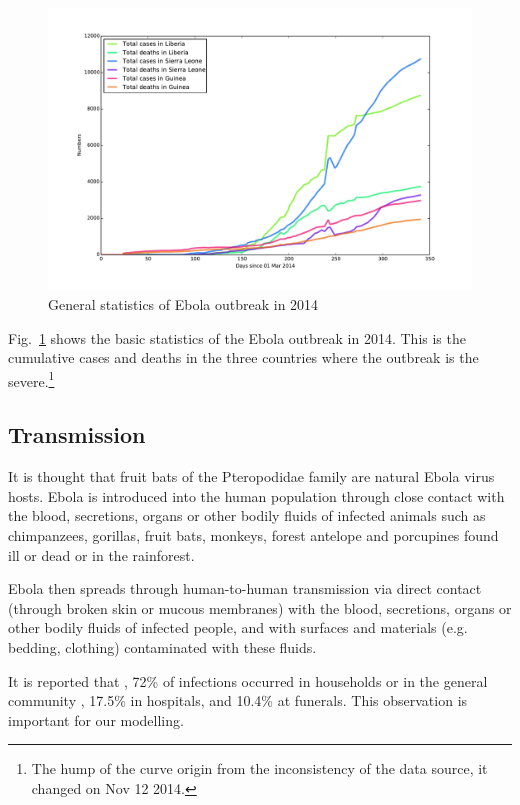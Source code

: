 \documentclass[11pt]{article}
\begin{document}
\begin{figure}[hbt]
\begin{center}
  \includegraphics[width=6in]{graph/bstats.pdf}
  \caption{General statistics of Ebola outbreak in 2014}
  \label{stats}
\end{center}  
\end{figure}

Fig.~\ref{stats} shows the basic statistics of the Ebola outbreak in 2014. This is the cumulative cases and deaths in the three countries where the outbreak is the severe.\footnote{The hump of the curve origin from the inconsistency of the data source, it changed on Nov 12 2014.}



\subsection{Transmission}

It is thought that fruit bats of the Pteropodidae family are natural Ebola virus hosts. Ebola is introduced into the human population through close contact with the blood, secretions, organs or other bodily fluids of infected animals such as chimpanzees, gorillas, fruit bats, monkeys, forest antelope and porcupines found ill or dead or in the rainforest.


Ebola then spreads through human-to-human transmission via direct contact (through broken skin or mucous membranes) with the blood, secretions, organs or other bodily fluids of infected people, and with surfaces and materials (e.g. bedding, clothing) contaminated with these fluids.

It is reported that \cite{merler2015spatiotemporal}, 72\%  of infections occurred in households or in the general community , 17.5\% in hospitals, and 10.4\% at funerals. This observation is important for our modelling.
\end{document}
